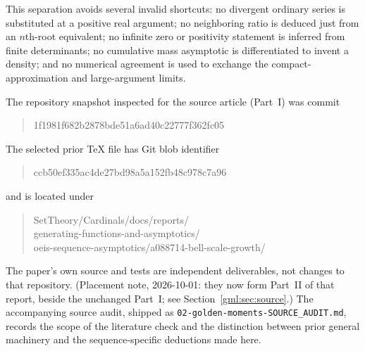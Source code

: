 \documentclass[11pt]{article}
\numberwithin{equation}{section}
\theoremstyle{definition}
\theoremstyle{remark}
\begin{document}
This separation avoids several invalid shortcuts: no divergent ordinary
series is substituted at a positive real argument; no neighboring ratio
is deduced just from an $n$th-root equivalent; no infinite zero or
positivity statement is inferred from finite determinants; no cumulative
mass asymptotic is differentiated to invent a density; and no numerical
agreement is used to exchange the compact-approximation and large-argument
limits.

The repository snapshot inspected for the source article (Part~I) was commit
\begin{quote}\small\ttfamily
1f1981f682b2878bde51a6ad40c22777f362fc05
\end{quote}
The selected prior TeX file has Git blob identifier
\begin{quote}\small\ttfamily
ccb50ef335ac4de27bd98a5a152fb48c978c7a96
\end{quote}
and is located under
\begin{quote}\small\ttfamily
SetTheory/Cardinals/docs/reports/\\
generating-functions-and-asymptotics/\\
oeis-sequence-asymptotics/a088714-bell-scale-growth/
\end{quote}
The paper's own source and tests are independent deliverables, not changes
to that repository. (Placement note, 2026-10-01: they now form Part~II of
that report, beside the unchanged Part~I; see
Section~\ref{gml:sec:source}.) The accompanying source audit, shipped as
\texttt{02-golden-moments-SOURCE\_AUDIT.md}, records the
scope of the literature check and the distinction between prior general
machinery and the sequence-specific deductions made here.
\end{document}

